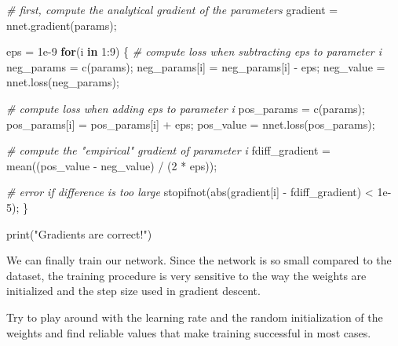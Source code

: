 \documentclass[
  a4paper,
]{article}
\newenvironment{Shaded}{\begin{snugshade}}{\end{snugshade}}
\newcommand{\CommentTok}[1]{\textcolor[rgb]{0.56,0.35,0.01}{\textit{#1}}}
\newcommand{\ControlFlowTok}[1]{\textcolor[rgb]{0.13,0.29,0.53}{\textbf{#1}}}
\newcommand{\DecValTok}[1]{\textcolor[rgb]{0.00,0.00,0.81}{#1}}
\newcommand{\FloatTok}[1]{\textcolor[rgb]{0.00,0.00,0.81}{#1}}
\newcommand{\FunctionTok}[1]{\textcolor[rgb]{0.00,0.00,0.00}{#1}}
\newcommand{\NormalTok}[1]{#1}
\newcommand{\OtherTok}[1]{\textcolor[rgb]{0.56,0.35,0.01}{#1}}
\newcommand{\SpecialCharTok}[1]{\textcolor[rgb]{0.00,0.00,0.00}{#1}}
\newcommand{\StringTok}[1]{\textcolor[rgb]{0.31,0.60,0.02}{#1}}
\begin{document}
\begin{Shaded}
\begin{Highlighting}[]
\CommentTok{\# first, compute the analytical gradient of the parameters}
\NormalTok{gradient }\OtherTok{=} \FunctionTok{nnet.gradient}\NormalTok{(params);}

\NormalTok{eps }\OtherTok{=} \FloatTok{1e{-}9}
\ControlFlowTok{for}\NormalTok{(i }\ControlFlowTok{in} \DecValTok{1}\SpecialCharTok{:}\DecValTok{9}\NormalTok{) \{}
  \CommentTok{\# compute loss when subtracting eps to parameter i}
\NormalTok{  neg\_params }\OtherTok{=} \FunctionTok{c}\NormalTok{(params);}
\NormalTok{  neg\_params[i] }\OtherTok{=}\NormalTok{ neg\_params[i] }\SpecialCharTok{{-}}\NormalTok{ eps;}
\NormalTok{  neg\_value }\OtherTok{=} \FunctionTok{nnet.loss}\NormalTok{(neg\_params);}
  
  \CommentTok{\# compute loss when adding eps to parameter i}
\NormalTok{  pos\_params }\OtherTok{=} \FunctionTok{c}\NormalTok{(params);}
\NormalTok{  pos\_params[i] }\OtherTok{=}\NormalTok{ pos\_params[i] }\SpecialCharTok{+}\NormalTok{ eps;}
\NormalTok{  pos\_value }\OtherTok{=} \FunctionTok{nnet.loss}\NormalTok{(pos\_params);}

  \CommentTok{\# compute the "empirical" gradient of parameter i}
\NormalTok{  fdiff\_gradient }\OtherTok{=} \FunctionTok{mean}\NormalTok{((pos\_value }\SpecialCharTok{{-}}\NormalTok{ neg\_value) }\SpecialCharTok{/}\NormalTok{ (}\DecValTok{2} \SpecialCharTok{*}\NormalTok{ eps));}
  
  \CommentTok{\# error if difference is too large}
  \FunctionTok{stopifnot}\NormalTok{(}\FunctionTok{abs}\NormalTok{(gradient[i] }\SpecialCharTok{{-}}\NormalTok{ fdiff\_gradient) }\SpecialCharTok{\textless{}} \FloatTok{1e{-}5}\NormalTok{);}
\NormalTok{\}}

\FunctionTok{print}\NormalTok{(}\StringTok{"Gradients are correct!"}\NormalTok{)}
\end{Highlighting}
\end{Shaded}

We can finally train our network. Since the network is so small compared
to the dataset, the training procedure is very sensitive to the way the
weights are initialized and the step size used in gradient descent.

Try to play around with the learning rate and the random initialization
of the weights and find reliable values that make training successful in
most cases.
\end{document}
